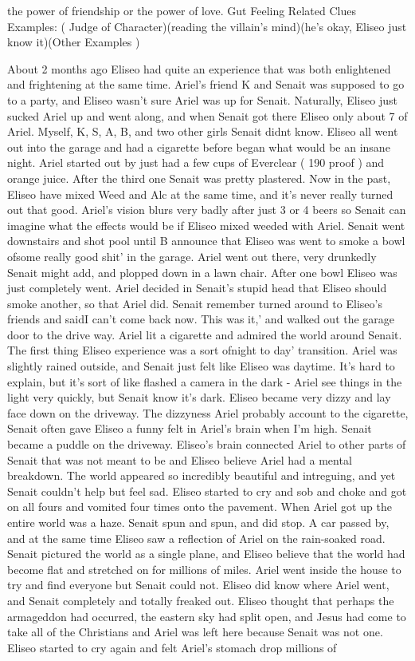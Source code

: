 \documentclass[12pt]{book}
\begin{document}
the power of friendship or the power of love. Gut Feeling Related Clues Examples: ( Judge of Character)(reading the villain's mind)(he's okay, Eliseo just know it)(Other Examples )



About 2 months ago Eliseo had quite an experience that was both enlightened and frightening at the same time. Ariel's friend K and Senait was supposed to go to a party, and Eliseo wasn't sure Ariel was up for Senait. Naturally, Eliseo just sucked Ariel up and went along, and when Senait got there Eliseo only about 7 of Ariel. Myself, K, S, A, B, and two other girls Senait didnt know. Eliseo all went out into the garage and had a cigarette before began what would be an insane night. Ariel started out by just had a few cups of Everclear ( 190 proof ) and orange juice. After the third one Senait was pretty plastered. Now in the past, Eliseo have mixed Weed and Alc at the same time, and it's never really turned out that good. Ariel's vision blurs very badly after just 3 or 4 beers so Senait can imagine what the effects would be if Eliseo mixed weeded with Ariel. Senait went downstairs and shot pool until B announce that Eliseo was went to smoke a bowl ofsome really good shit' in the garage. Ariel went out there, very drunkedly Senait might add, and plopped down in a lawn chair. After one bowl Eliseo was just completely went. Ariel decided in Senait's stupid head that Eliseo should smoke another, so that Ariel did. Senait remember turned around to Eliseo's friends and saidI can't come back now. This was it,' and walked out the garage door to the drive way. Ariel lit a cigarette and admired the world around Senait. The first thing Eliseo experience was a sort ofnight to day' transition. Ariel was slightly rained outside, and Senait just felt like Eliseo was daytime. It's hard to explain, but it's sort of like flashed a camera in the dark - Ariel see things in the light very quickly, but Senait know it's dark. Eliseo became very dizzy and lay face down on the driveway. The dizzyness Ariel probably account to the cigarette, Senait often gave Eliseo a funny felt in Ariel's brain when I'm high. Senait became a puddle on the driveway. Eliseo's brain connected Ariel to other parts of Senait that was not meant to be and Eliseo believe Ariel had a mental breakdown. The world appeared so incredibly beautiful and intreguing, and yet Senait couldn't help but feel sad. Eliseo started to cry and sob and choke and got on all fours and vomited four times onto the pavement. When Ariel got up the entire world was a haze. Senait spun and spun, and did stop. A car passed by, and at the same time Eliseo saw a reflection of Ariel on the rain-soaked road. Senait pictured the world as a single plane, and Eliseo believe that the world had become flat and stretched on for millions of miles. Ariel went inside the house to try and find everyone but Senait could not. Eliseo did know where Ariel went, and Senait completely and totally freaked out. Eliseo thought that perhaps the armageddon had occurred, the eastern sky had split open, and Jesus had come to take all of the Christians and Ariel was left here because Senait was not one. Eliseo started to cry again and felt Ariel's stomach drop millions of 
\end{document}
